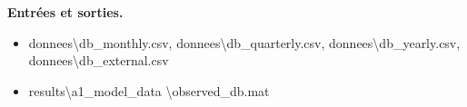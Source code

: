 \begin{enumerate}
    {\bf Entrées et sorties.}
    \begin{itemize}
    \item[\textrightarrow] {\color{magenta}donnees\textbackslash db\_monthly.csv},
    {\color{magenta}donnees\textbackslash db\_quarterly.csv},
    {\color{magenta}donnees\textbackslash db\_yearly.csv},
    {\color{magenta}donnees\textbackslash db\_external.csv}
    \item[\textleftarrow] {\color{magenta}results\textbackslash a1\_model\_data \textbackslash observed\_db.mat}
    \end{itemize}
\end{enumerate}